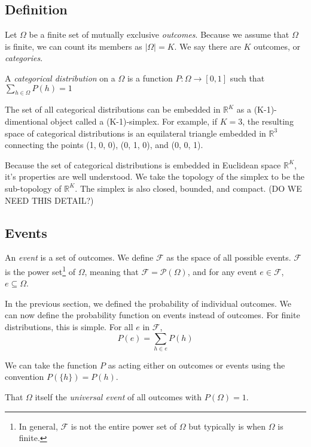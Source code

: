 \documentclass[twoside]{article}
\begin{document}
\subsection{Definition}

Let \(\Omega\) be a finite set of mutually exclusive \textit{outcomes}. Because we assume that \(\Omega\) is finite, we can count its members as \(|\Omega| = K\). We say there are \(K\) outcomes, or \textit{categories}.

A \textit{categorical distribution} on a \(\Omega\) is a function \(P: \Omega \rightarrow [0, 1]\) such that \(\sum_{h \in \Omega} P(h) = 1\)

The set of all categorical distributions can be embedded in \(\mathbb{R}^K\) as a (K-1)-dimentional object called a (K-1)-simplex. For example, if \(K = 3\), the resulting space of categorical distributions is an equilateral triangle embedded in \(\mathbb{R}^3\) connecting the points (1, 0, 0), (0, 1, 0), and (0, 0, 1).

Because the set of categorical distributions is embedded in Euclidean space \(\mathbb{R}^K\), it's properties are well understood. We take the topology of the simplex to be the sub-topology of \(\mathbb{R}^K\). The simplex is also closed, bounded, and compact. (DO WE NEED THIS DETAIL?)

\subsection{Events}

An \textit{event} is a set of outcomes. We define \(\mathcal{F}\) as the space of all possible events. \(\mathcal{F}\) is the power set\footnote{In general, \(\mathcal{F}\) is not the entire power set of \(\Omega\) but typically is when \(\Omega\) is finite.} of \(\Omega\), meaning that \(\mathcal{F} = \mathcal{P}(\Omega)\), and for any event \(e \in \mathcal{F}\), \(e \subseteq \Omega\).

In the previous section, we defined the probability of individual outcomes. We can now define the probability function on events instead of outcomes. For finite distributions, this is simple. For all \(e\) in \(\mathcal{F}\),
\[ P(e) = \sum_{h \in e}{P({h})}\]

We can take the function \(P\) as acting either on outcomes or events using the convention \(P(\{h\}) = P(h)\). 

That \(\Omega\) itself the \textit{universal event} of all outcomes with \(P(\Omega) = 1\).
\end{document}
